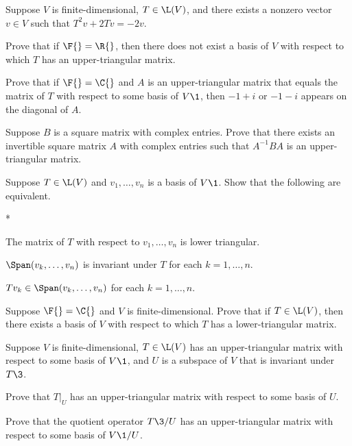 \exercise
Suppose $V$ is finite-dimensional, $T \in \L(V)$, and there exists a nonzero vector $v \in V$ such that
$T^2 v + 2Tv = -2v$.
\begin{subtheorem}
\item
Prove that if $\F{} = \R{}$, then there does not exist a basis of $V$ with respect to which $T$ has an upper-triangular matrix.
\item
Prove that if $\F{} = \C{}$ and $A$ is an upper-triangular matrix that equals the matrix of $T$ with respect to some basis of $V\1$, then $-1 + i$ or $-1 - i$ appears on the diagonal of $A$.
\end{subtheorem}
\exercisesubtheoremend


\exercise
Suppose $B$ is a square matrix with complex entries. Prove that there exists an
invertible square matrix $A$ with complex entries such that $A^{-1} B A$ is an
upper-triangular matrix.


\exercise
Suppose $T \in \L(V)$ and $v_1, \dots, v_n$ is a basis of $V\1$. Show that the following are equivalent.\label{5lower}
\begin{subtheorem}*
\item
The matrix of $T$ with respect to $v_1, \dots, v_n$ is lower triangular.
\item
$\Span(v_k, \dots, v_n)$ is invariant under $T$ for each $k = 1, \dots, n$.
\item
$Tv_k \in \Span(v_k, \dots, v_n)$ for each $k = 1, \dots, n$.
\end{subtheorem}


\exercise
Suppose $\F{} = \C{}$ and $V$ is finite-dimensional. Prove that if $T \in \L(V)$, then there exists a basis of $V$ with respect to which $T$ has a lower-triangular matrix.


\exercise
Suppose $V$ is finite-dimensional, $T \in \L(V)$ has an upper-triangular matrix with respect to some basis of $V\1$, and $U$ is a subspace of $V$ that is invariant under $T\3$.
\begin{subtheorem}
\item
Prove that $T|_U$ has an upper-triangular matrix with respect to some basis of $U$.
\item
Prove that the quotient operator $T\3/U$ has an upper-triangular matrix with respect to some basis of $V\1/U$.
\end{subtheorem}


